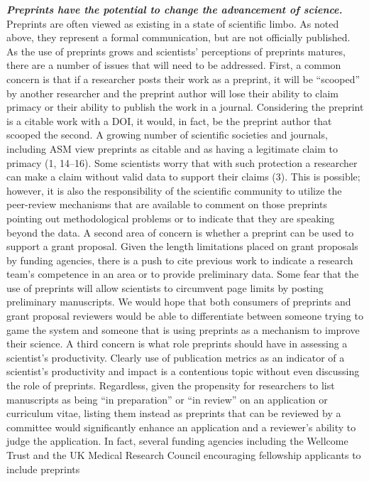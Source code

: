 \documentclass[11pt,]{article}
\begin{document}
\textbf{\emph{Preprints have the potential to change the advancement of
science.}} Preprints are often viewed as existing in a state of
scientific limbo. As noted above, they represent a formal communication,
but are not officially published. As the use of preprints grows and
scientists' perceptions of preprints matures, there are a number of
issues that will need to be addressed. First, a common concern is that
if a researcher posts their work as a preprint, it will be ``scooped''
by another researcher and the preprint author will lose their ability to
claim primacy or their ability to publish the work in a journal.
Considering the preprint is a citable work with a DOI, it would, in
fact, be the preprint author that scooped the second. A growing number
of scientific societies and journals, including ASM view preprints as
citable and as having a legitimate claim to primacy (1, 14--16). Some
scientists worry that with such protection a researcher can make a claim
without valid data to support their claims (3). This is possible;
however, it is also the responsibility of the scientific community to
utilize the peer-review mechanisms that are available to comment on
those preprints pointing out methodological problems or to indicate that
they are speaking beyond the data. A second area of concern is whether a
preprint can be used to support a grant proposal. Given the length
limitations placed on grant proposals by funding agencies, there is a
push to cite previous work to indicate a research team's competence in
an area or to provide preliminary data. Some fear that the use of
preprints will allow scientists to circumvent page limits by posting
preliminary manuscripts. We would hope that both consumers of preprints
and grant proposal reviewers would be able to differentiate between
someone trying to game the system and someone that is using preprints as
a mechanism to improve their science. A third concern is what role
preprints should have in assessing a scientist's productivity. Clearly
use of publication metrics as an indicator of a scientist's productivity
and impact is a contentious topic without even discussing the role of
preprints. Regardless, given the propensity for researchers to list
manuscripts as being ``in preparation'' or ``in review'' on an
application or curriculum vitae, listing them instead as preprints that
can be reviewed by a committee would significantly enhance an
application and a reviewer's ability to judge the application. In fact,
several funding agencies including the Wellcome Trust and the UK Medical
Research Council encouraging fellowship applicants to include preprints
\end{document}
